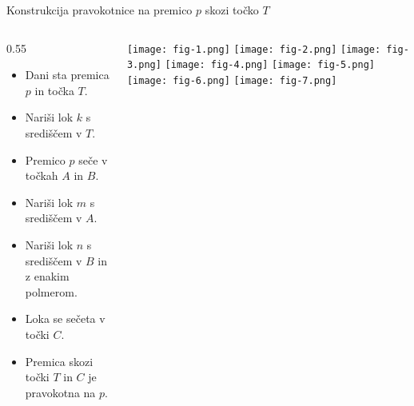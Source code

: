 \begin{frame}{Konstrukcija pravokotnice na premico $p$ skozi točko $T$}
\begin{columns}
	
	\begin{column}{0.55\teexwidth}
		\begin{itemize}
			 \item <1-->Dani sta premica $p$ in točka $T$.
			 \item <2-->Nariši lok $k$ s središčem v $T$.
			 \item <3-->Premico $p$ seče v točkah $A$ in $B$.
			 \item <4-->Nariši lok $m$ s središčem v $A$.
			 \item <5-->Nariši lok $n$ s središčem v $B$ in z enakim polmerom.
			 \item <6-->Loka se sečeta v točki $C$.
			 \item <7-->Premica skozi točki $T$ in $C$ je pravokotna na $p$.
		  \end{itemize}
	\end{column}

	\begin{column}{0.45\textwidth}
		\centering
		\texttt{[image: fig-1.png]}%
		  \texttt{[image: fig-2.png]}%
	      \texttt{[image: fig-3.png]}%
	      \texttt{[image: fig-4.png]}%
	      \texttt{[image: fig-5.png]}%
	      \texttt{[image: fig-6.png]}%
	      \texttt{[image: fig-7.png]}%
	\end{column}
\end{columns}

\end{frame}




